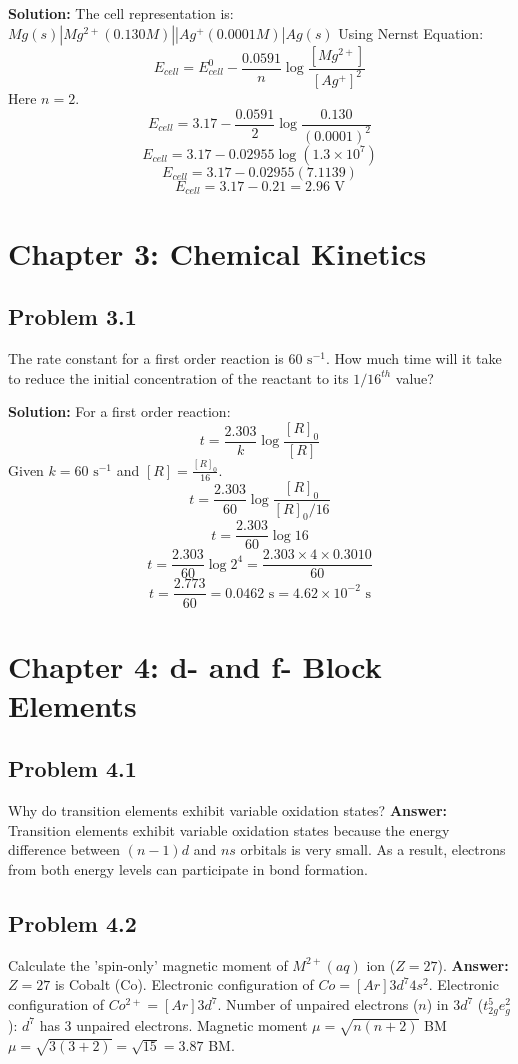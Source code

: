 \documentclass[12pt, a4paper]{article}
\begin{document}
\textbf{Solution:}
The cell representation is: $Mg(s) | Mg^{2+}(0.130 M) || Ag^+(0.0001 M) | Ag(s)$
Using Nernst Equation:
\[ E_{cell} = E^0_{cell} - \frac{0.0591}{n} \log \frac{[Mg^{2+}]}{[Ag^+]^2} \]
Here $n = 2$.
\[ E_{cell} = 3.17 - \frac{0.0591}{2} \log \frac{0.130}{(0.0001)^2} \]
\[ E_{cell} = 3.17 - 0.02955 \log(1.3 \times 10^7) \]
\[ E_{cell} = 3.17 - 0.02955(7.1139) \]
\[ E_{cell} = 3.17 - 0.21 = 2.96 \text{ V} \]

\section*{Chapter 3: Chemical Kinetics}

\subsection*{Problem 3.1}
The rate constant for a first order reaction is $60 \text{ s}^{-1}$. How much time will it take to reduce the initial concentration of the reactant to its $1/16^{th}$ value?

\textbf{Solution:}
For a first order reaction:
\[ t = \frac{2.303}{k} \log \frac{[R]_0}{[R]} \]
Given $k = 60 \text{ s}^{-1}$ and $[R] = \frac{[R]_0}{16}$.
\[ t = \frac{2.303}{60} \log \frac{[R]_0}{[R]_0/16} \]
\[ t = \frac{2.303}{60} \log 16 \]
\[ t = \frac{2.303}{60} \log 2^4 = \frac{2.303 \times 4 \times 0.3010}{60} \]
\[ t = \frac{2.773}{60} = 0.0462 \text{ s} = 4.62 \times 10^{-2} \text{ s} \]

\section*{Chapter 4: d- and f- Block Elements}

\subsection*{Problem 4.1}
Why do transition elements exhibit variable oxidation states?
\textbf{Answer:} Transition elements exhibit variable oxidation states because the energy difference between $(n-1)d$ and $ns$ orbitals is very small. As a result, electrons from both energy levels can participate in bond formation.

\subsection*{Problem 4.2}
Calculate the 'spin-only' magnetic moment of $M^{2+}(aq)$ ion ($Z = 27$).
\textbf{Answer:} $Z = 27$ is Cobalt (Co). Electronic configuration of $Co = [Ar] 3d^7 4s^2$.
Electronic configuration of $Co^{2+} = [Ar] 3d^7$.
Number of unpaired electrons ($n$) in $3d^7$ ($t_{2g}^5 e_g^2$):
$d^7$ has 3 unpaired electrons.
Magnetic moment $\mu = \sqrt{n(n+2)}$ BM
$\mu = \sqrt{3(3+2)} = \sqrt{15} = 3.87$ BM.
\end{document}
